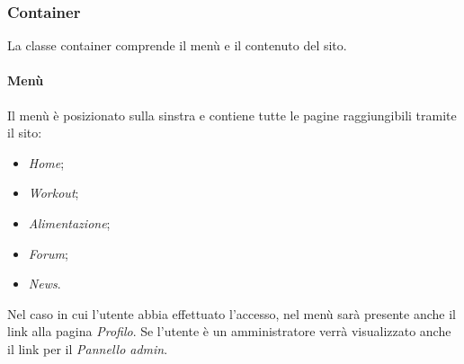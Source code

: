 \subsubsection{Container}
La classe container comprende il menù e il contenuto del sito.
\paragraph{Menù}
Il menù è posizionato sulla sinstra e contiene tutte le pagine raggiungibili tramite il sito:
\begin{itemize}
	\item \textit{Home};
	\item \textit{Workout};
	\item \textit{Alimentazione};
	\item \textit{Forum};
	\item \textit{News}.
\end{itemize}
Nel caso in cui l'utente abbia effettuato l'accesso, nel menù sarà presente anche il link alla pagina \textit{Profilo}. Se l'utente è un amministratore verrà visualizzato anche il link per il \textit{Pannello admin}.
